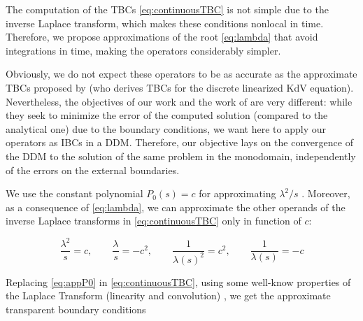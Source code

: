 \indent The computation of the TBCs \eqref{eq:continuousTBC} is not simple due to the inverse Laplace transform, which makes these conditions nonlocal in time. Therefore, we propose approximations of the root \eqref{eq:lambda} that avoid integrations in time, making the operators considerably simpler.

\indent Obviously,  \added[id=2017] we do not expect these operators to be as accurate as the approximate TBCs proposed by \cite{besse2015} (who derives TBCs for the discrete linearized KdV equation). Nevertheless, the objectives of our work and the work of \cite{besse2015} are very different: while they seek to minimize the error of the computed solution (compared to the analytical one) due to the boundary conditions, we want here to apply our  operators as IBCs in a DDM. Therefore, our objective lays on the convergence of the DDM to the solution of the same problem in the monodomain, independently of the errors on the external boundaries. 

\indent We use the constant polynomial $P_0(s) = c$ for approximating $\lambda^2/s$ . Moreover, as a consequence of \eqref{eq:lambda}, we can approximate the other operands of the inverse Laplace transforms in \eqref{eq:continuousTBC} only in function of $c$:

\begin{equation}
	\label{eq:appP0}
	\frac{\lambda^2}{s}  = c, \qquad
	\frac{\lambda}{s}  = -c^2, \qquad
	\frac{1}{\lambda(s)^2}  = c^2, \qquad 
	 \frac{1}{\lambda(s)}  = -c 
\end{equation}

\indent Replacing \eqref{eq:appP0} in \eqref{eq:continuousTBC}, using some well-know properties of the Laplace Transform (linearity and convolution) , we get the approximate transparent boundary conditions


